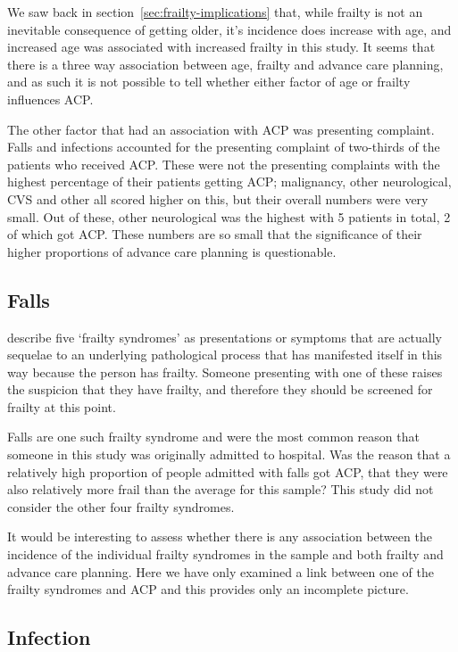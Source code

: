 \documentclass
[
	12pt,
	a4paper,
	oneside,
]{report}
\begin{document}
We saw back in 
section~\ref{sec:frailty-implications} that, while frailty is not an
inevitable consequence of getting older, it's incidence does increase with age,
and increased age was associated with increased frailty in this study. It seems
that there is a three way association between age, frailty and advance care 
planning, and as such it is not possible to tell whether either factor of 
age or frailty influences ACP. 

The other factor that had an association with ACP was presenting complaint.
Falls and infections accounted for the presenting complaint of two-thirds
of the patients who received ACP. These were not the presenting complaints
with the highest percentage of their patients getting ACP; malignancy, other
neurological, CVS and other all scored higher on this, but their overall numbers
were very small. Out of these, other neurological was the highest with 5 patients in 
total, 2 of which got ACP. These numbers are so small that the significance
of their higher proportions of advance care planning is questionable. 

\subsection{Falls}

\textcite{bgs:14} describe five `frailty syndromes' as presentations or 
symptoms that are actually sequelae to an underlying pathological process
that has manifested itself in this way because the person has frailty.
Someone presenting with one of these raises the suspicion that they have frailty,
and therefore they should be screened for frailty at this point.

Falls are one such frailty syndrome and were the most common reason that someone
in this study was originally admitted to hospital. Was the reason that a 
relatively high proportion of people admitted with falls got ACP, that they 
were also relatively more frail than the average for this sample? This study
did not consider the other four frailty syndromes.

It would be interesting to assess whether there is 
any association between the incidence of the individual frailty syndromes 
in the sample and both frailty and advance care planning. Here we have only
examined a link between one of the frailty syndromes and ACP and this
provides only an incomplete picture.  

\subsection{Infection}
\end{document}
